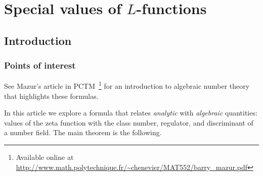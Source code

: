 \chapter{Special values of $L$-functions}
\setcounter{section}{-1}
\section{Introduction}
\subsection{Points of interest}


See Mazur's article in PCTM~\cite{PCTM}\footnote{Available online at \url{http://www.math.polytechnique.fr/~chenevier/MAT552/barry_mazur.pdf}} for an introduction to algebraic number theory that highlights these formulas.

In this %
article we explore a formula that relates {\it analytic} with {\it algebraic} quantities: values of the zeta function with the class number, regulator, and discriminant of a number field. The main theorem is the following.



